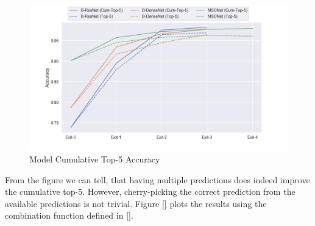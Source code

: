 \begin{figure}
	\centering
	\includegraphics[width=\linewidth]{figures/edge/top5cumulative}
	\caption[Top-5 Cumulative]{Model Cumulative Top-5 Accuracy}
	\label{fig:top-5-cumulative}
\end{figure}

From the figure we can tell, that having multiple predictions does indeed improve the cumulative top-5. However, cherry-picking the correct prediction from the available predictions is not trivial. Figure \ref{} plots the results using the combination function defined in \ref{}. 

